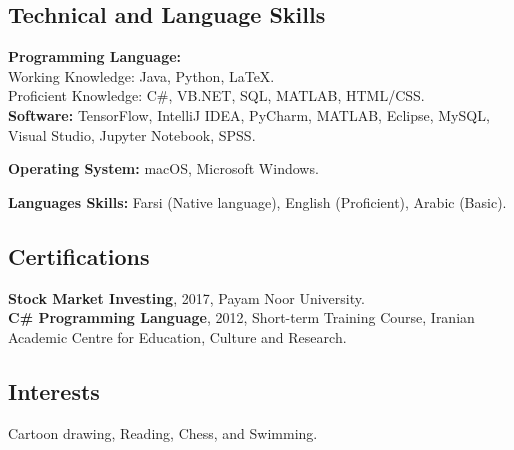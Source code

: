 \documentclass[10pt]{article}
\begin{document}
\subsection*{Technical and Language Skills}

\noindent \textbf{Programming Language:} \\
\indent Working Knowledge: Java, Python, \LaTeX.\\
\indent Proficient Knowledge:  C\#, VB.NET, SQL, MATLAB, HTML/CSS.\\
\noindent \textbf{Software:} TensorFlow, IntelliJ IDEA, PyCharm, MATLAB, Eclipse, MySQL, Visual Studio, Jupyter Notebook, SPSS.

\noindent \textbf{Operating System:} macOS, Microsoft Windows.

\noindent \textbf{Languages Skills: }Farsi (Native language), English (Proficient), Arabic (Basic).

\subsection*{Certifications}
\noindent \textbf{Stock Market Investing}, 2017, Payam Noor University.\\
\noindent \textbf{C\# Programming Language}, 2012, Short-term Training Course, Iranian Academic Centre for Education, Culture and Research.

\subsection*{Interests}
Cartoon drawing, Reading, Chess, and Swimming.
\end{document}
